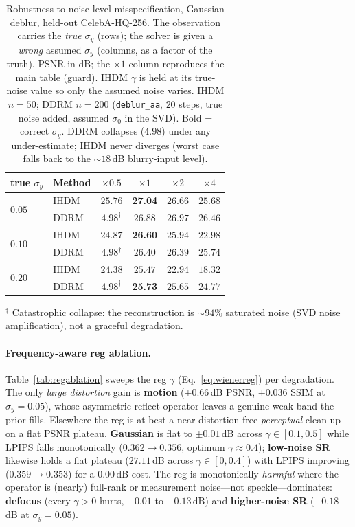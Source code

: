 \documentclass[11pt]{article}
\begin{document}
\begin{table}[h]
\centering
\caption{Robustness to noise-level misspecification, Gaussian deblur, held-out CelebA-HQ-256. The
observation carries the \emph{true} $\sigma_y$ (rows); the solver is given a \emph{wrong} assumed
$\sigma_y$ (columns, as a factor of the truth). PSNR in dB; the $\times1$ column reproduces the main
table (guard). IHDM $\gamma$ is held at its true-noise value so only the assumed noise varies. IHDM
$n{=}50$; DDRM $n{=}200$ (\texttt{deblur\_aa}, $20$ steps, true noise added, assumed $\sigma_0$ in
the SVD). Bold = correct $\sigma_y$. DDRM collapses ($4.98$) under any under-estimate; IHDM never
diverges (worst case falls back to the $\sim\!18$\,dB blurry-input level).}
\label{tab:robust}
\begin{tabular}{llcccc}
\toprule
true $\sigma_y$ & Method & $\times0.5$ & $\times1$ & $\times2$ & $\times4$ \\
\midrule
\multirow{2}{*}{$0.05$}
 & IHDM & $25.76$ & \textbf{27.04} & $26.66$ & $25.68$ \\
 & DDRM & $\mathbf{4.98}^{\dagger}$ & $26.88$ & $26.97$ & $26.46$ \\
\midrule
\multirow{2}{*}{$0.10$}
 & IHDM & $24.87$ & \textbf{26.60} & $25.94$ & $22.98$ \\
 & DDRM & $\mathbf{4.98}^{\dagger}$ & $26.40$ & $26.39$ & $25.74$ \\
\midrule
\multirow{2}{*}{$0.20$}
 & IHDM & $24.38$ & $25.47$ & $22.94$ & $18.32$ \\
 & DDRM & $\mathbf{4.98}^{\dagger}$ & \textbf{25.73} & $25.65$ & $24.77$ \\
\bottomrule
\end{tabular}

\vspace{2pt}
{\footnotesize $^{\dagger}$ Catastrophic collapse: the reconstruction is $\sim\!94\%$ saturated
noise (SVD noise amplification), not a graceful degradation.}
\end{table}

\paragraph{Frequency-aware reg ablation.}
Table~\ref{tab:regablation} sweeps the reg $\gamma$ (Eq.~\ref{eq:wienerreg}) per degradation. The
only \emph{large distortion} gain is \textbf{motion} ($+0.66$\,dB PSNR, $+0.036$ SSIM at
$\sigma_y{=}0.05$), whose asymmetric reflect operator leaves a genuine weak band the prior fills.
Elsewhere the reg is at best a near distortion-free \emph{perceptual} clean-up on a flat PSNR
plateau. \textbf{Gaussian} is flat to $\pm0.01$\,dB across $\gamma\in[0.1,0.5]$ while LPIPS falls
monotonically ($0.362\!\to\!0.356$, optimum $\gamma\!\approx\!0.4$); \textbf{low-noise SR} likewise
holds a flat plateau ($27.11$\,dB across $\gamma\in[0,0.4]$) with LPIPS improving ($0.359\!\to\!0.353$)
for a $0.00$\,dB cost. The reg is monotonically \emph{harmful} where the operator is (nearly)
full-rank or measurement noise---not speckle---dominates: \textbf{defocus} (every $\gamma>0$ hurts,
$-0.01$ to $-0.13$\,dB) and \textbf{higher-noise SR} ($-0.18$\,dB at $\sigma_y{=}0.05$).
\end{document}
